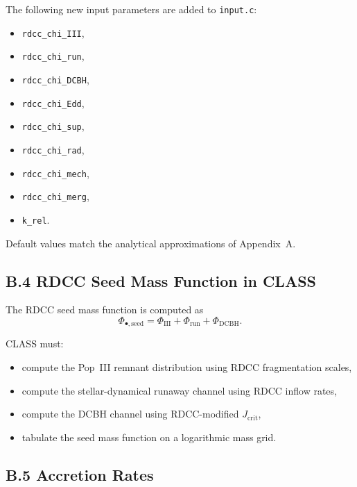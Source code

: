 \documentclass[11pt,a4paper]{article}
\begin{document}
The following new input parameters are added to \texttt{input.c}:

\begin{itemize}
    \item \texttt{rdcc\_chi\_III},
    \item \texttt{rdcc\_chi\_run},
    \item \texttt{rdcc\_chi\_DCBH},
    \item \texttt{rdcc\_chi\_Edd},
    \item \texttt{rdcc\_chi\_sup},
    \item \texttt{rdcc\_chi\_rad},
    \item \texttt{rdcc\_chi\_mech},
    \item \texttt{rdcc\_chi\_merg},
    \item \texttt{k\_rel}.
\end{itemize}

Default values match the analytical approximations of Appendix~A.

\subsection*{B.4 RDCC Seed Mass Function in CLASS}

The RDCC seed mass function is computed as
\begin{equation}
    \Phi_{\bullet,\mathrm{seed}}
    = \Phi_{\mathrm{III}}
    + \Phi_{\mathrm{run}}
    + \Phi_{\mathrm{DCBH}}.
\end{equation}

CLASS must:

\begin{itemize}
    \item compute the Pop~III remnant distribution using RDCC fragmentation scales,
    \item compute the stellar-dynamical runaway channel using RDCC inflow rates,
    \item compute the DCBH channel using RDCC-modified $J_{\mathrm{crit}}$,
    \item tabulate the seed mass function on a logarithmic mass grid.
\end{itemize}

\subsection*{B.5 Accretion Rates}
\end{document}
